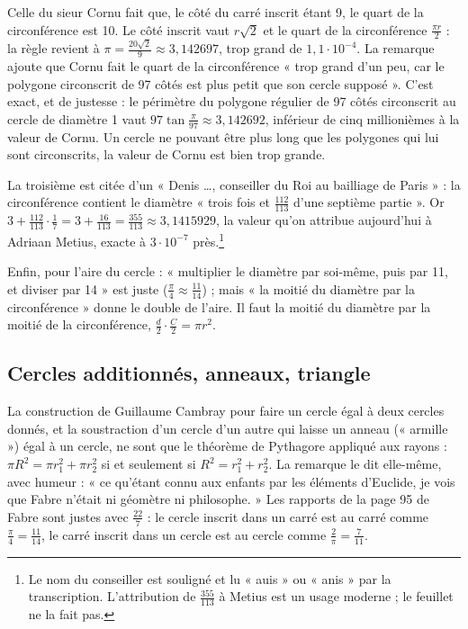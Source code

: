 \documentclass[11pt,a4paper]{article}
\begin{document}
Celle du sieur Cornu fait que, le côté du carré inscrit étant 9, le quart de la
circonférence est 10. Le côté inscrit vaut $r\sqrt2$ et le quart de la
circonférence $\frac{\pi r}{2}$ : la règle revient à
$\pi = \frac{20\sqrt2}{9} \approx 3{,}142697$, trop grand de $1{,}1\cdot10^{-4}$.
La remarque ajoute que Cornu fait le quart de la circonférence « trop grand
d'un peu, car le polygone circonscrit de 97 côtés est plus petit que son
cercle supposé ». C'est exact, et de justesse : le périmètre du polygone
régulier de 97 côtés circonscrit au cercle de diamètre 1 vaut
$97\tan\frac{\pi}{97} \approx 3{,}142692$, inférieur de cinq millionièmes à la
valeur de Cornu. Un cercle ne pouvant être plus long que les polygones qui
lui sont circonscrits, la valeur de Cornu est bien trop grande.

La troisième est citée d'un « Denis \dots, conseiller du Roi au bailliage de
Paris » : la circonférence contient le diamètre « trois fois et
$\frac{112}{113}$ d'une septième partie ». Or
$3 + \frac{112}{113}\cdot\frac17 = 3 + \frac{16}{113} = \frac{355}{113}
\approx 3{,}1415929$, la valeur qu'on attribue aujourd'hui à Adriaan Metius,
exacte à $3\cdot10^{-7}$ près.\footnote{Le nom du conseiller est souligné et lu
« auis » ou « anis » par la transcription. L'attribution de $\frac{355}{113}$ à
Metius est un usage moderne ; le feuillet ne la fait pas.}

Enfin, pour l'aire du cercle : « multiplier le diamètre par soi-même, puis par
11, et diviser par 14 » est juste ($\frac{\pi}{4} \approx \frac{11}{14}$) ; mais
« la moitié du diamètre par la circonférence » donne le double de l'aire. Il
faut la moitié du diamètre par la moitié de la circonférence,
$\frac{d}{2}\cdot\frac{C}{2} = \pi r^2$.

\subsection*{Cercles additionnés, anneaux, triangle}

La construction de Guillaume Cambray pour faire un cercle égal à deux cercles
donnés, et la soustraction d'un cercle d'un autre qui laisse un anneau
(« armille ») égal à un cercle, ne sont que le théorème de Pythagore appliqué
aux rayons : $\pi R^2 = \pi r_1^2 + \pi r_2^2$ si et seulement si
$R^2 = r_1^2 + r_2^2$. La remarque le dit elle-même, avec humeur : « ce qu'étant
connu aux enfants par les éléments d'Euclide, je vois que Fabre n'était ni
géomètre ni philosophe. » Les rapports de la page 95 de Fabre sont justes avec
$\frac{22}{7}$ : le cercle inscrit dans un carré est au carré comme
$\frac{\pi}{4} = \frac{11}{14}$, le carré inscrit dans un cercle est au cercle
comme $\frac{2}{\pi} = \frac{7}{11}$.
\end{document}
